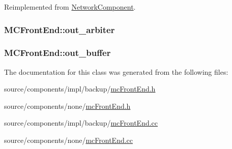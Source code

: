 Reimplemented from \hyperlink{classNetworkComponent_56599b3484333fb78af1b6c33f77cf16}{NetworkComponent}.\hypertarget{classMCFrontEnd_8a05a43c211013595ed1e81ade65c58a}{
\subsubsection[{out\_\-arbiter}]{ {\bf MCFrontEnd::out\_\-arbiter}}}
\label{classMCFrontEnd_8a05a43c211013595ed1e81ade65c58a}


\hypertarget{classMCFrontEnd_573d6ed88ea7603b71f29c8d09995997}{
\subsubsection[{out\_\-buffer}]{ {\bf MCFrontEnd::out\_\-buffer}}}
\label{classMCFrontEnd_573d6ed88ea7603b71f29c8d09995997}




The documentation for this class was generated from the following files:\begin{CompactItemize}
\item 
source/components/impl/backup/\hyperlink{impl_2backup_2mcFrontEnd_8h}{mcFrontEnd.h}\item 
source/components/none/\hyperlink{none_2mcFrontEnd_8h}{mcFrontEnd.h}\item 
source/components/impl/backup/\hyperlink{impl_2backup_2mcFrontEnd_8cc}{mcFrontEnd.cc}\item 
source/components/none/\hyperlink{none_2mcFrontEnd_8cc}{mcFrontEnd.cc}\end{CompactItemize}

